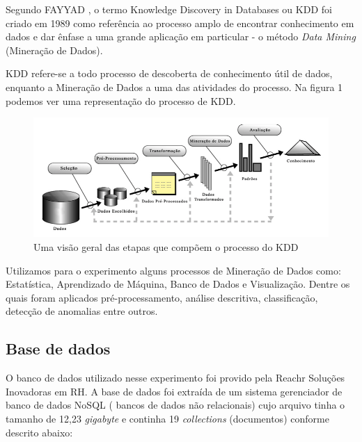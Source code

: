 \documentclass[conference]{IEEEtran}
\begin{document}
    Segundo FAYYAD \cite{kdd}, o termo Knowledge Discovery in Databases ou KDD foi criado em 1989 como referência ao processo amplo de encontrar conhecimento em dados e dar ênfase a uma grande aplicação em particular - o método \textit{Data Mining }(Mineração de Dados).
    
    KDD refere-se a todo processo de descoberta de conhecimento útil de dados, enquanto a Mineração de Dados a uma das atividades do processo. Na figura 1 podemos ver uma representação do processo de KDD.
   
	\begin{figure}[htbp]
	\centerline{\includegraphics[scale=0.3]{imagens/kdd.png}}
	\caption{Uma visão geral das etapas que compõem o processo do KDD}
	
	\label{fig}
	\end{figure}

    Utilizamos para o experimento alguns processos de Mineração de Dados como: Estatística, Aprendizado de Máquina, Banco de Dados e Visualização. Dentre os quais foram aplicados pré-processamento, análise descritiva, classificação, detecção de anomalias entre outros.

    \subsection{Base de dados}

 O banco de dados utilizado nesse experimento foi provido pela Reachr Soluções Inovadoras em RH.
A base de dados foi extraída de um sistema gerenciador de banco de dados NoSQL ( bancos de dados não relacionais) cujo arquivo tinha o tamanho de 12,23 \textit{gigabyte} e continha 19 \textit{collections} (documentos) conforme descrito abaixo:
\end{document}
